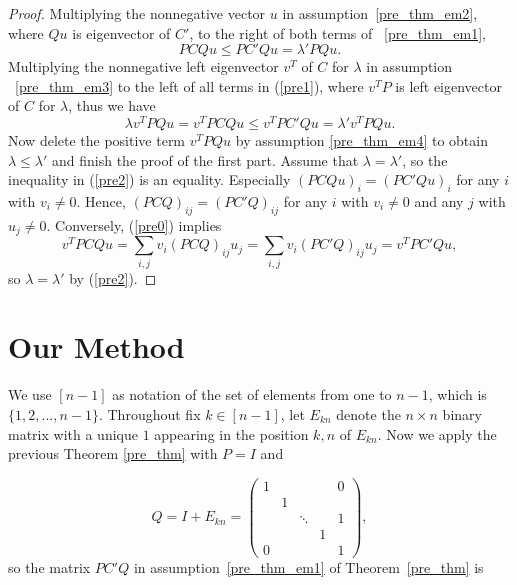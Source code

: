 \documentclass[12pt, a4paper]{article}
\theoremstyle{plain}
\theoremstyle{definition}
\begin{document}
\begin{proof}
    Multiplying the nonnegative vector $u$ in assumption~\ref{pre_thm_em2}, where $Qu$ is eigenvector of $C'$, to the right of both terms of
    ~\ref{pre_thm_em1},
    \begin{equation}\label{pre1}
       PCQu\leq PC'Qu=\lambda'PQu.
    \end{equation}
    Multiplying the nonnegative left eigenvector $v^T$ of $C$ for $\lambda$ in assumption
     ~\ref{pre_thm_em3} to the left of all terms  in (\ref{pre1}), where $v^TP$ is
    left eigenvector of $C$ for $\lambda$, thus we have
    \begin{equation}\label{pre2}
        \lambda v^TPQu=v^TPCQu\leq v^TPC'Qu=\lambda' v^TPQu.
    \end{equation}
        Now delete the positive term $v^TPQu$ by assumption \ref{pre_thm_em4} to obtain
        $\lambda\leq \lambda'$ and finish the proof of the first part.
        Assume that $\lambda=\lambda'$, so the inequality in (\ref{pre2}) is an equality.
        Especially $(PCQu)_i=(PC'Qu)_i$ for any $i$ with $v_i\not=0.$ Hence,
        $(PCQ)_{ij}=(PC'Q)_{ij}$ for any $i$ with $v_i\not=0$ and any $j$ with
        $u_j\not=0.$ Conversely, (\ref{pre0}) implies $$v^TPCQu=\sum_{i,j} v_i(PCQ)_{ij}u_j=
         \sum_{i,j} v_i(PC'Q)_{ij}u_j=v^TPC'Qu,$$ so $\lambda=\lambda'$ by (\ref{pre2}).
\end{proof}

\section{Our Method}

We use $[n-1]$ as notation of the set of elements from one to $n-1$, which is $\{1,2,...,n-1\}$.
Throughout fix $k\in [n-1]$, let $E_{kn}$ denote the $n\times n$ binary matrix with a unique $1$
appearing in the position $k,n$ of $E_{kn}$. Now we apply the previous Theorem \ref{pre_thm} with $P=I$ and


\begin{equation} \label{Q_1}
Q=I+E_{kn}=\begin{pmatrix}
1 &   &         &   & 0 \\
  & 1 &         &   &   \\
  &   & \ddots  &   & 1 \\
  &   &         & 1 &  \\
0 &   &         &     & 1
\end{pmatrix},
\end{equation}
so the matrix $PC'Q$ in assumption~\ref{pre_thm_em1} of Theorem~\ref{pre_thm} is
\end{document}
